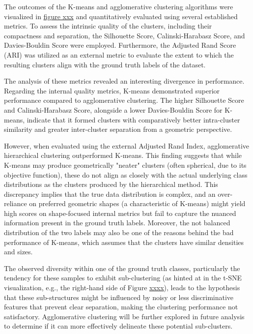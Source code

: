 \documentclass{article}
\begin{document}
The outcomes of the K-means and agglomerative clustering algorithms were visualized in \underline{figure xxx} and quantitatively evaluated using several established metrics. To assess the intrinsic quality of the clusters, including their compactness and separation, the Silhouette Score, Calinski-Harabasz Score, and Davies-Bouldin Score were employed. Furthermore, the Adjusted Rand Score (ARI) was utilized as an external metric to evaluate the extent to which the resulting clusters align with the ground truth labels of the dataset.

The analysis of these metrics revealed an interesting divergence in performance. Regarding the internal quality metrics, K-means demonstrated superior performance compared to agglomerative clustering. The higher Silhouette Score and Calinski-Harabasz Score, alongside a lower Davies-Bouldin Score for K-means, indicate that it formed clusters with comparatively better intra-cluster similarity and greater inter-cluster separation from a geometric perspective.

However, when evaluated using the external Adjusted Rand Index, agglomerative hierarchical clustering outperformed K-means. This finding suggests that while K-means may produce geometrically "neater" clusters (often spherical, due to its objective function), these do not align as closely with the actual underlying class distributions as the clusters produced by the hierarchical method. This discrepancy implies that the true data distribution is complex, and an over-reliance on preferred geometric shapes (a characteristic of K-means) might yield high scores on shape-focused internal metrics but fail to capture the nuanced information present in the ground truth labels. Moreover, the not balanced distribution of the two labels may also be one of the reasons behind the bad performance of K-means, which assumes that the clusters have similar densities and sizes.

The observed diversity within one of the ground truth classes, particularly the tendency for these samples to exhibit sub-clustering (as hinted at in the t-SNE visualization, e.g., the right-hand side of Figure \underline{xxxx}), leads to the hypothesis that these sub-structures might be influenced by noisy or less discriminative features that prevent clear separation, making the clustering performance not satisfactory. Agglomerative clustering will be further explored in future analysis to determine if it can more effectively delineate these potential sub-clusters.
\end{document}
